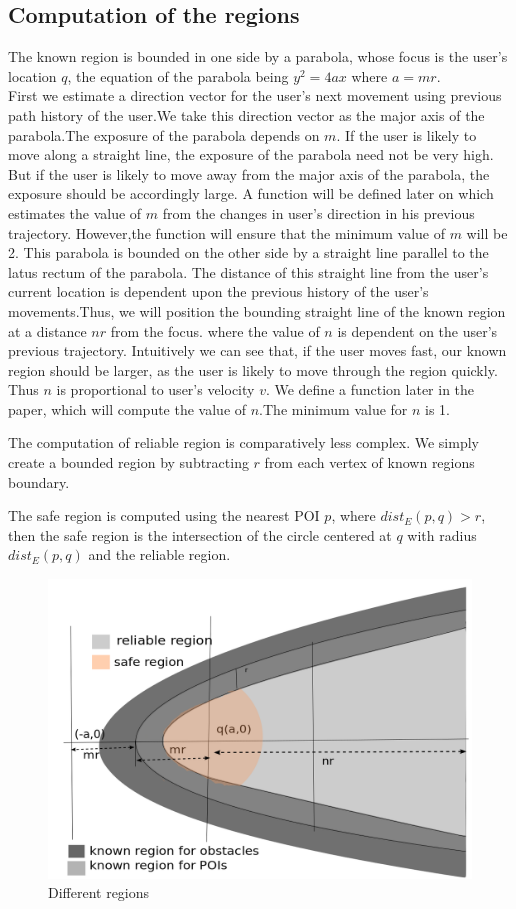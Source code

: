\documentclass{sig-alternate}
\begin{document}
\subsection{Computation of the regions}
The known region is bounded in one side by a parabola, whose focus is the user's location $q$, the equation of the parabola being $y^2=4ax $ where $ a=mr$.\\
First we estimate a direction vector for the user's next movement using previous path history of the user.We take this direction vector as the major axis of the parabola.The exposure of the parabola depends on $m$. If the user is likely to move along a straight line, the exposure of the parabola need not be very high. But if the user is likely to move away from the major axis of the parabola, the exposure should be accordingly large.  A function will be defined later on which estimates the value of $m$ from the changes in user's direction in his previous trajectory. However,the function will ensure that the minimum value of $m$ will be 2. This parabola is bounded on the other side by a straight line parallel to the latus rectum of the parabola. The distance of this straight line from the user's current location is dependent upon the previous history of the user's movements.Thus, we will position the bounding straight line of the known region at a distance $ nr $ from the focus. where the value of $n$ is dependent on the user's previous trajectory. Intuitively we can see that, if the user moves fast, our known region should be larger, as the user is likely to move through the region quickly. Thus $n$ is proportional to user's velocity $v$. We define a function later in the paper, which will compute the value of $n$.The minimum value for $n$ is 1.

The computation of reliable region is comparatively less complex. We simply create a bounded region by subtracting $r$ from each vertex of known regions boundary. 

The safe region is computed using the nearest POI $p$, where $dist_E(p,q)>r$, then the safe region is the intersection of the circle centered at $q$ with radius $dist_E(p,q)$ and the reliable region.

\begin{figure}[h]
  \includegraphics[width=\linewidth]{regions_def.png}
  \caption{Different regions}
  \label{fig:regions}
\end{figure}
\end{document}
